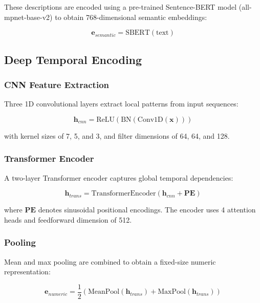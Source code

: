 \documentclass[conference]{IEEEtran}
\begin{document}
These descriptions are encoded using a pre-trained Sentence-BERT model (all-mpnet-base-v2) to obtain 768-dimensional semantic embeddings:

\begin{equation}
    \mathbf{e}_{semantic} = \text{SBERT}(\text{text})
\end{equation}

\subsection{Deep Temporal Encoding}

\subsubsection{CNN Feature Extraction}

Three 1D convolutional layers extract local patterns from input sequences:

\begin{equation}
    \mathbf{h}_{cnn} = \text{ReLU}(\text{BN}(\text{Conv1D}(\mathbf{x})))
\end{equation}

with kernel sizes of 7, 5, and 3, and filter dimensions of 64, 64, and 128.

\subsubsection{Transformer Encoder}

A two-layer Transformer encoder captures global temporal dependencies:

\begin{equation}
    \mathbf{h}_{trans} = \text{TransformerEncoder}(\mathbf{h}_{cnn} + \mathbf{PE})
\end{equation}

where $\mathbf{PE}$ denotes sinusoidal positional encodings. The encoder uses 4 attention heads and feedforward dimension of 512.

\subsubsection{Pooling}

Mean and max pooling are combined to obtain a fixed-size numeric representation:

\begin{equation}
    \mathbf{e}_{numeric} = \frac{1}{2}(\text{MeanPool}(\mathbf{h}_{trans}) + \text{MaxPool}(\mathbf{h}_{trans}))
\end{equation}
\end{document}
